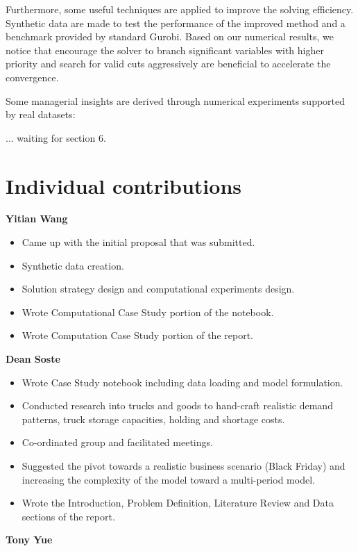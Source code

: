 \documentclass[a4paper,12pt]{article}
\begin{document}
Furthermore, some useful techniques are applied to improve the solving efficiency. Synthetic data are made to test the performance of the improved method and a benchmark provided by standard Gurobi. Based on our numerical results, we notice that encourage the solver to branch significant variables with higher priority and search for valid cuts aggressively are beneficial to accelerate the convergence.

Some managerial insights are derived through numerical experiments supported by real datasets:

... waiting for section 6.



\section{Individual contributions}\label{sec:individual-contributions}
\textbf{Yitian Wang}
\begin{itemize}
    \item Came up with the initial proposal that was submitted.
    \item Synthetic data creation.
    \item Solution strategy design and computational experiments design.
    \item Wrote Computational Case Study portion of the notebook.
    \item Wrote Computation Case Study portion of the report.
\end{itemize}

\textbf{Dean Soste}
\begin{itemize}
    \item Wrote Case Study notebook including data loading and model formulation.
    \item Conducted research into trucks and goods to hand-craft realistic demand patterns, truck storage capacities, holding and shortage costs.
    \item Co-ordinated group and facilitated meetings.
    \item Suggested the pivot towards a realistic business scenario (Black Friday) and increasing the complexity of the model toward a multi-period model.
    \item Wrote the Introduction, Problem Definition, Literature Review and Data sections of the report.
\end{itemize}

\textbf{Tony Yue}
\begin{itemize}
\end{itemize}
\end{document}
